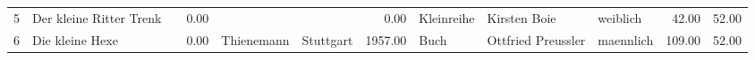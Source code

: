 \begin{table}
\begin{center}
{\begin{tabular}{rllrllrlllrr}
  5 & Der kleine Ritter Trenk                                                                                                                                                                                                                                         &                                                                                                                                                                                                                                                                 & 0.00 &                                                                                                                                                                                                                                                                 &                                                                                                                                                                                                                                                                 & 0.00 & Kleinreihe & Kirsten Boie                                                                                                                                                                                                                                                    & weiblich & 42.00 & 52.00 \\ 
  6 & Die kleine Hexe                                                                                                                                                                                                                                                 &                                                                                                                                                                                                                                                                 & 0.00 & Thienemann                                                                                                                                                                                                                                                      & Stuttgart                                                                                                                                                                                                                                                       & 1957.00 & Buch & Ottfried Preussler                                                                                                                                                                                                                                              & maennlich & 109.00 & 52.00 \\ 

\end{tabular}}
\end{center}
\end{table}
